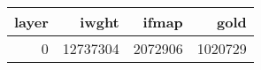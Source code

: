\begin{tabular}{rrrr}
\toprule
 layer &    iwght &   ifmap &    gold \\
\midrule
     0 & 12737304 & 2072906 & 1020729 \\
\bottomrule
\end{tabular}
